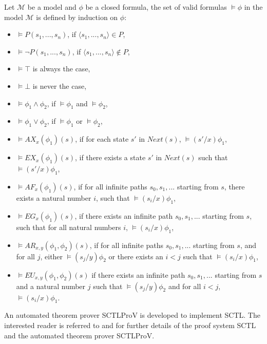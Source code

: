 \documentclass[runningheads]{llncs}
\begin{document}
\begin{definition}\color{blue}
Let $\mathcal{M}$ be a model and $\phi$ be a closed formula, the set of valid formulas $\models \phi$ in the model $\mathcal{M}$ is defined by induction on $\phi$:
 
\begin{itemize}
        \item $\models P(s_1,...,s_n)$, if $\langle s_1,...,s_n\rangle \in P$,
        \item $\models \neg P(s_1,...,s_n)$, if $\langle s_1,...,s_n\rangle \notin P$,
        \item $\models \top$ is always the case, 
        \item $\models \bot$ is never the case,
        \item $\models \phi_1\wedge\phi_2$, if $\models \phi_1$ and $\models \phi_2$,
        \item $\models \phi_1\vee\phi_2$, if $\models \phi_1$ or $\models \phi_2$,
        \item $\models AX_x(\phi_1)(s)$, if for each state $s'$ in $Next(s)$, $\models (s'/x)\phi_1$,
        \item $\models EX_x(\phi_1)(s)$, if there exists a state $s'$ in $Next(s)$ such that $\models (s'/x)\phi_1$,
        \item $\models AF_x(\phi_1)(s)$, if for all infinite paths $s_0,s_1,...$ starting from $s$, there exists a natural number $i$, such that $\models (s_i/x)\phi_1$,
        \item $\models EG_x(\phi_1)(s)$, if there exists an infinite path $s_0,s_1,...$ starting from $s$, such that for all natural numbers $i$, $\models (s_i/x)\phi_1$,
        \item $\models AR_{x, y}(\phi_1,\phi_2)(s)$, if for all infinite paths $s_0,s_1,...$ starting from $s$, and for all $j$, either $\models (s_j/y)\phi_2$ or there exists an $i<j$ such that $\models (s_i/x)\phi_1$,
        \item $\models EU_{x, y}(\phi_1,\phi_2)(s)$ if there exists an infinite path $s_0,s_1,...$ starting from $s$ and a natural number $j$ such that $\models (s_j/y)\phi_2$ and for all $i<j$, $\models (s_i/x)\phi_1$.
\end{itemize}
\end{definition}
 
An automated theorem prover \textsf{SCTLProV} is developed to implement \textsf{SCTL}.
The interested reader is referred to \cite{dowek2013logical} and \cite{LiuDJJ16} for further details of the proof system \textsf{SCTL} and the automated theorem prover \textsf{SCTLProV}.
 
\end{document}
